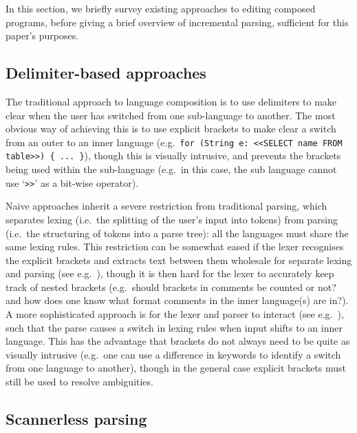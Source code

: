 \documentclass[sigplan,screen]{acmart}\settopmatter{printfolios=true,printccs=false,printacmref=false}
\begin{document}
In this section, we briefly survey existing approaches to editing composed
programs, before giving a brief overview of incremental parsing, sufficient for
this paper's purposes.


\subsection{Delimiter-based approaches}

The traditional approach to language composition is to use delimiters
to make clear when the user has switched from one sub-language to another. The
most obvious way of achieving this is to use explicit brackets to make clear a
switch from an outer to an inner language (e.g.~\texttt{for (String e: <<SELECT name
FROM table>>) \{ ... \}}), though this is visually intrusive, and prevents the
brackets being used within the sub-language (e.g.~in this case, the sub language
cannot use `\texttt{>>}' as a bit-wise operator).

Naive approaches inherit a severe restriction from traditional parsing, which
separates lexing (i.e.~the splitting of the user's input into tokens) from
parsing (i.e.~the structuring of tokens into a parse tree): all the languages
must share the same lexing rules. This restriction can be somewhat eased if the
lexer recognises the explicit brackets and extracts text between them wholesale
for separate lexing and parsing (see e.g.~\cite[p.~13-14]{tratt08domainspecific}),
though it is then hard for the lexer to accurately keep track of nested
brackets (e.g.~should brackets in comments be counted or not? and how does
one know what format comments in the inner language(s) are in?).  A
more sophisticated approach is for the lexer and parser to interact (see
e.g.~\cite{wyk07context}), such that the parse causes a switch in lexing rules
when input shifts to an inner language.
This has the advantage that brackets do not always need to be quite as visually
intrusive (e.g.~one can use a difference in keywords to identify a switch from
one language to another), though in the general case explicit brackets must still be
used to resolve ambiguities.


\subsection{Scannerless parsing}
\label{sec:scannerless}
\end{document}
